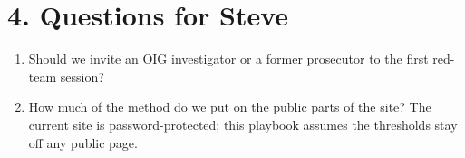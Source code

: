 \documentclass[letterpaper,11pt]{article}
\providecommand{\tightlist}{\setlength{\itemsep}{0pt}\setlength{\parskip}{0pt}}
\begin{document}
\hypertarget{questions-for-steve}{%
\section*{4. Questions for Steve}\label{questions-for-steve}}

\begin{enumerate}
\def\labelenumi{\arabic{enumi}.}
\tightlist
\item
  Should we invite an OIG investigator or a former prosecutor to the
  first red-team session?
\item
  How much of the method do we put on the public parts of the site? The
  current site is password-protected; this playbook assumes the
  thresholds stay off any public page.
\end{enumerate}
\end{document}
